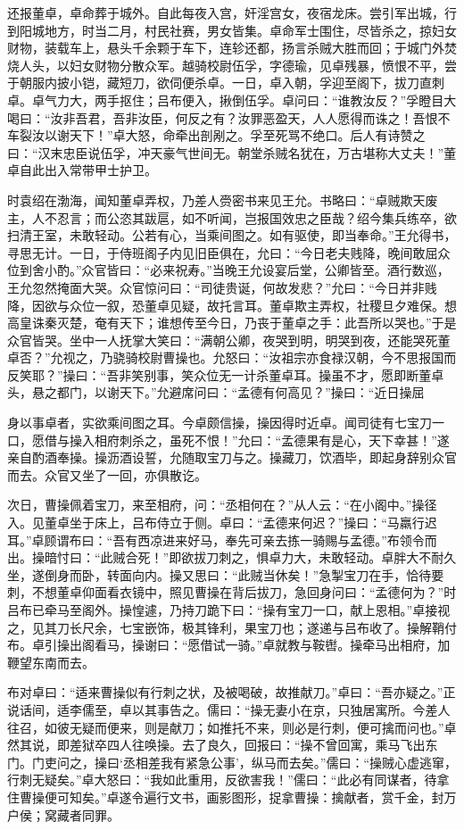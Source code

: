 还报董卓，卓命葬于城外。自此每夜入宫，奸淫宫女，夜宿龙床。尝引军出城，行到阳城地方，时当二月，村民社赛，男女皆集。卓命军士围住，尽皆杀之，掠妇女财物，装载车上，悬头千余颗于车下，连轸还都，扬言杀贼大胜而回；于城门外焚烧人头，以妇女财物分散众军。越骑校尉伍孚，字德瑜，见卓残暴，愤恨不平，尝于朝服内披小铠，藏短刀，欲伺便杀卓。一日，卓入朝，孚迎至阁下，拔刀直刺卓。卓气力大，两手抠住；吕布便入，揪倒伍孚。卓问曰：“谁教汝反？”孚瞪目大喝曰：“汝非吾君，吾非汝臣，何反之有？汝罪恶盈天，人人愿得而诛之！吾恨不车裂汝以谢天下！”卓大怒，命牵出剖剐之。孚至死骂不绝口。后人有诗赞之曰：“汉末忠臣说伍孚，冲天豪气世间无。朝堂杀贼名犹在，万古堪称大丈夫！”董卓自此出入常带甲士护卫。

时袁绍在渤海，闻知董卓弄权，乃差人赍密书来见王允。书略曰：“卓贼欺天废主，人不忍言；而公恣其跋扈，如不听闻，岂报国效忠之臣哉？绍今集兵练卒，欲扫清王室，未敢轻动。公若有心，当乘间图之。如有驱使，即当奉命。”王允得书，寻思无计。一日，于侍班阁子内见旧臣俱在，允曰：“今日老夫贱降，晚间敢屈众位到舍小酌。”众官皆曰：“必来祝寿。”当晚王允设宴后堂，公卿皆至。酒行数巡，王允忽然掩面大哭。众官惊问曰：“司徒贵诞，何故发悲？”允曰：“今日并非贱降，因欲与众位一叙，恐董卓见疑，故托言耳。董卓欺主弄权，社稷旦夕难保。想高皇诛秦灭楚，奄有天下；谁想传至今日，乃丧于董卓之手：此吾所以哭也。”于是众官皆哭。坐中一人抚掌大笑曰：“满朝公卿，夜哭到明，明哭到夜，还能哭死董卓否？”允视之，乃骁骑校尉曹操也。允怒曰：“汝祖宗亦食禄汉朝，今不思报国而反笑耶？”操曰：“吾非笑别事，笑众位无一计杀董卓耳。操虽不才，愿即断董卓头，悬之都门，以谢天下。”允避席问曰：“孟德有何高见？”操曰：“近日操屈

身以事卓者，实欲乘间图之耳。今卓颇信操，操因得时近卓。闻司徒有七宝刀一口，愿借与操入相府刺杀之，虽死不恨！”允曰：“孟德果有是心，天下幸甚！”遂亲自酌酒奉操。操沥酒设誓，允随取宝刀与之。操藏刀，饮酒毕，即起身辞别众官而去。众官又坐了一回，亦俱散讫。

次日，曹操佩着宝刀，来至相府，问：“丞相何在？”从人云：“在小阁中。”操径入。见董卓坐于床上，吕布侍立于侧。卓曰：“孟德来何迟？”操曰：“马羸行迟耳。”卓顾谓布曰：“吾有西凉进来好马，奉先可亲去拣一骑赐与孟德。”布领令而出。操暗忖曰：“此贼合死！”即欲拔刀刺之，惧卓力大，未敢轻动。卓胖大不耐久坐，遂倒身而卧，转面向内。操又思曰：“此贼当休矣！”急掣宝刀在手，恰待要刺，不想董卓仰面看衣镜中，照见曹操在背后拔刀，急回身问曰：“孟德何为？”时吕布已牵马至阁外。操惶遽，乃持刀跪下曰：“操有宝刀一口，献上恩相。”卓接视之，见其刀长尺余，七宝嵌饰，极其锋利，果宝刀也；遂递与吕布收了。操解鞘付布。卓引操出阁看马，操谢曰：“愿借试一骑。”卓就教与鞍辔。操牵马出相府，加鞭望东南而去。

布对卓曰：“适来曹操似有行刺之状，及被喝破，故推献刀。”卓曰：“吾亦疑之。”正说话间，适李儒至，卓以其事告之。儒曰：“操无妻小在京，只独居寓所。今差人往召，如彼无疑而便来，则是献刀；如推托不来，则必是行刺，便可擒而问也。”卓然其说，即差狱卒四人往唤操。去了良久，回报曰：“操不曾回寓，乘马飞出东门。门吏问之，操曰‘丞相差我有紧急公事’，纵马而去矣。”儒曰：“操贼心虚逃窜，行刺无疑矣。”卓大怒曰：“我如此重用，反欲害我！”儒曰：“此必有同谋者，待拿住曹操便可知矣。”卓遂令遍行文书，画影图形，捉拿曹操：擒献者，赏千金，封万户侯；窝藏者同罪。

